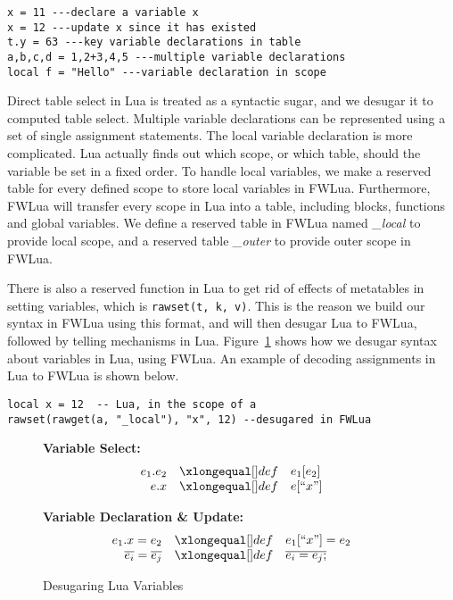 \begin{verbatim}
x = 11 ---declare a variable x
x = 12 ---update x since it has existed
t.y = 63 ---key variable declarations in table
a,b,c,d = 1,2+3,4,5 ---multiple variable declarations
local f = "Hello" ---variable declaration in scope
\end{verbatim}

Direct table select in Lua is treated as a syntactic sugar, and we desugar it to computed table select. 
Multiple variable declarations can be represented using a set of single assignment statements. 
The local variable declaration is more complicated. Lua actually finds out which scope, or which table, should the variable be set in a fixed order.
To handle local variables,
we make a reserved table for every defined scope to store local variables in FWLua. Furthermore, FWLua will transfer every scope in Lua into a table, including blocks, functions and global variables. We define a reserved table in FWLua named {\it \_local} to provide local scope, and a reserved table {\it \_outer} to provide outer scope in FWLua.

There is also a reserved function in Lua to get rid of effects of metatables in setting variables, which is {\tt rawset(t, k, v)}. This is the reason we build our syntax in FWLua using this format, and will then desugar Lua to FWLua, followed by telling mechanisms in Lua.
Figure~\ref{fig:desLuaVar} shows how we desugar syntax about variables in Lua, using FWLua.
An example of decoding assignments in Lua to FWLua is shown below.
\begin{verbatim}
local x = 12  -- Lua, in the scope of a
rawset(rawget(a, "_local"), "x", 12) --desugared in FWLua
\end{verbatim}

\begin{figure}
\caption{Desugaring Lua Variables}\label{fig:desLuaVar}
{\bf Variable Select:}\[
\begin{array}{rclcl}

\desugar{e_1.e_2}{e_1[e_2]}
\desugar{e.x}{e[``x"]}

\end{array}\]

{\bf Variable Declaration \& Update:}\[
\begin{array}{rclcl}

\desugar{e_1.x=e_2}{e_1[``x"] = e_2}
\desugar{\overline{e_i}=\overline{e_j}}{\overline{e_i = e_j;}} %
\end{array}\]
\end{figure}

